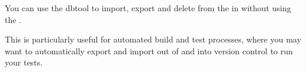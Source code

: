 You can use the dbtool to import, export and delete \gdprojects{} from the \gddb{} in without using the \ite{}. 

This is particularly useful for automated build and test processes, where you may want to automatically export and import \gdprojects{} out of and into version control to run your tests. 
